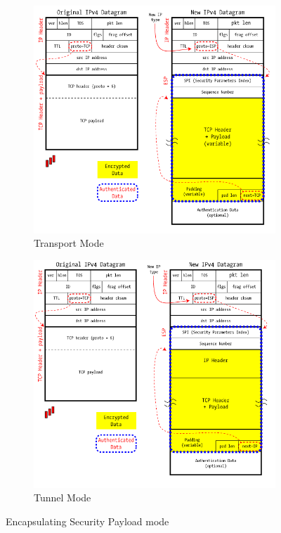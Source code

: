 \documentclass[12pt]{article}
\begin{document}
\begin{figure}[h!]
        \centering
        \begin{subfigure}[b]{0.45\textwidth}
                \centering
                \includegraphics[width=\textwidth]{ESP-1.png}
                \caption{Transport Mode}
                \end{subfigure}
        \qquad
        \begin{subfigure}[b]{0.45\textwidth}
                \centering
                \includegraphics[width=\textwidth]{ESP-2.png}
                \caption{Tunnel Mode}
                \end{subfigure}
        \caption{Encapsulating Security Payload mode}
\end{figure}
\end{document}
